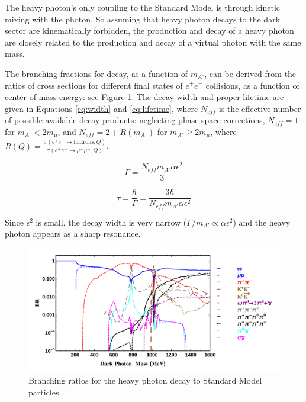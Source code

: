 The heavy photon's only coupling to the Standard Model is through kinetic mixing with the photon.
So assuming that heavy photon decays to the dark sector are kinematically forbidden, the production and decay of a heavy photon are closely related to the production and decay of a virtual photon with the same mass.

The branching fractions for decay, as a function of $m_{A'}$, can be derived from the ratios of cross sections for different final states of $e^+e^-$ collisions, as a function of center-of-mass energy: see Figure \ref{fig:branching}.
The decay width and proper lifetime are given in Equations \ref{eq:width} and \ref{eq:lifetime}, where $N_{eff}$ is the effective number of possible available decay products: neglecting phase-space corrections, $N_{eff}=1$ for $m_{A'}<2m_\mu$, and $N_{eff}=2+R(m_{A'})$ for $m_{A'}\ge 2m_\mu$, where $R(Q)=\frac{\sigma(e^+e^-\to \mathrm{hadrons},Q)}{\sigma(e^+e^-\to \mu^+\mu^-,Q)}$.

\begin{equation}
    \Gamma = \frac{N_{eff}m_{A'} \alpha \epsilon^2}{3}
    \label{eq:width}
\end{equation}

\begin{equation}
    \tau = \frac{\hbar}{\Gamma} = \frac{3\hbar}{N_{eff}m_{A'} \alpha \epsilon^2}
    \label{eq:lifetime}
\end{equation}

Since $\epsilon^2$ is small, the decay width is very narrow ($\Gamma/m_{A'}\propto \alpha \epsilon^2$) and the heavy photon appears as a sharp resonance.

\begin{figure}[ht]
    \includegraphics[width=\textwidth]{motivation/figs/darkphoton-BR-1-3000-LOG}
    \caption{Branching ratios for the heavy photon decay to Standard Model particles \cite{liu_signals_2015}.}
    \label{fig:branching}
\end{figure}


